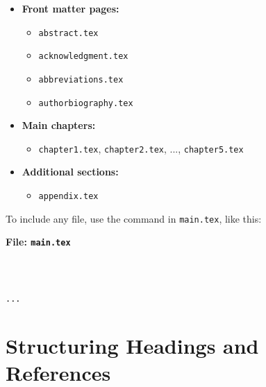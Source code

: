 \documentclass{VISTEC}
\begin{document}
\begin{itemize}[leftmargin=\paritemindent]
    \item \textbf{Front matter pages:}
    \begin{itemize}[leftmargin=0.5cm]
        \item \texttt{abstract.tex}
        \item \texttt{acknowledgment.tex}
        \item \texttt{abbreviations.tex}
        \item \texttt{authorbiography.tex}
    \end{itemize}
    
    \item \textbf{Main chapters:}
    \begin{itemize}[leftmargin=0.5cm]
        \item \texttt{chapter1.tex}, \texttt{chapter2.tex}, ..., \texttt{chapter5.tex}
    \end{itemize}
    
    \item \textbf{Additional sections:}
    \begin{itemize}[leftmargin=0.5cm]
        \item \texttt{appendix.tex}
    \end{itemize}
\end{itemize}

\begin{paragraph}
To include any file, use the \verb|| command in \texttt{main.tex}, like this:
\end{paragraph}

\noindent\textbf{File: \texttt{main.tex}}\vspace{-1.5em}
\begin{verbatim}



...

\end{verbatim}







\section{Structuring Headings and References}
\label{manual:headings}
\end{document}
